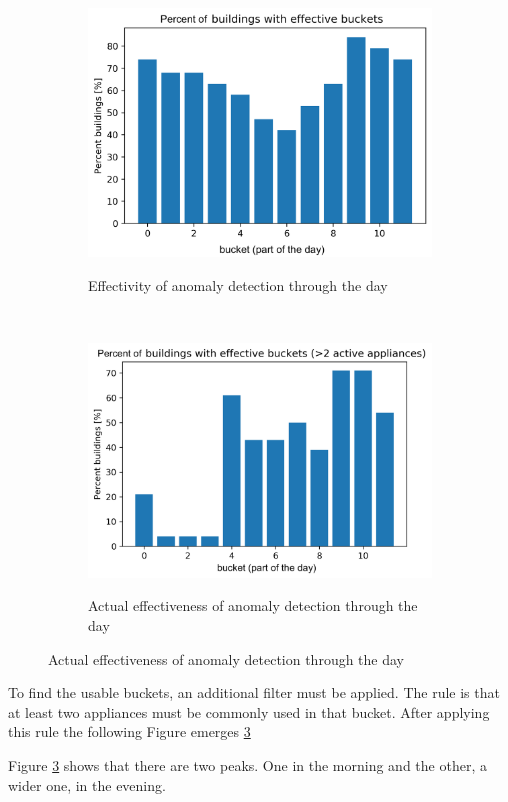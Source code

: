 \begin{figure}[H]
	\begin{subfigure}{.5\textwidth}
        \caption{Effectivity of anomaly detection through the day}
        \includegraphics[width=.8\textwidth]{Figures/EC/ignored_buckets_dist.png}
        \label{fig:ignored_buckets_22}
    \end{subfigure}
    ~
    \begin{subfigure}{.5\textwidth}
        \caption{Actual effectiveness of anomaly detection through the day}
        \includegraphics[width=.8\textwidth]{Figures/EC/all_ignored_buckets_dist_incl_act.png}
        \label{fig:ignored_buckets_act}
    \end{subfigure}
\end{figure}

To find the usable buckets, an additional filter must be applied.
The rule is that at least two appliances must be commonly used in that bucket. 
After applying this rule the following Figure emerges \ref{fig:ignored_buckets_act}

Figure \ref{fig:ignored_buckets_act} shows that there are two peaks.
One in the morning and the other, a wider one, in the evening.

